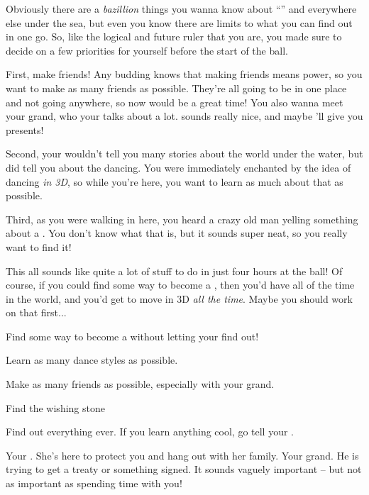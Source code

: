 \documentclass[char]{NeptuneBall}
\begin{document}
Obviously there are a \emph{bazillion} things you wanna know about "`\pAtlantis{}"' and everywhere else under the sea, but even you know there are limits to what you can find out in one go. So, like the logical \cWillow{\prince} and future ruler that you are, you made sure to decide on a few priorities for yourself before the start of the ball.

First, make friends! Any budding \cWillow{\prince} knows that making friends means power, so you want to make as many friends as possible. They're all going to be in one place and not going anywhere, so now would be a great time! You also wanna meet your grand\cKing{\pa}, who your \cAriel{\pa} talks about a lot. \cKing{\They} sounds really nice, and maybe \cKing{\they}'ll give you presents!

Second, your \cAriel{\pa} wouldn't tell you many stories about the world under the water, but \cAriel{\they} did tell you about the dancing. You were immediately enchanted by the idea of dancing \emph{in 3D}, so while you're here, you want to learn as much about that as possible.

Third, as you were walking in here, you heard a crazy old man yelling something about a \iWishingStone{\MYname}. You don't know what that is, but it sounds super neat, so you really want to find it!

This all sounds like quite a lot of stuff to do in just four hours at the ball! Of course, if you could find some way to become a \cWillow{\mer}, then you'd have all of the time in the world, and you'd get to move in 3D \emph{all the time}. Maybe you should work on that first...

\begin{itemz}[Goals]
  \item Find some way to become a \cWillow{\mer} without letting your \cAriel{\parent} find out!
  \item Learn as many dance styles as possible.
  \item Make as many friends as possible, especially with your grand\cKing{\pa}.
	\item Find the wishing stone
  \item Find out everything ever. If you learn anything cool, go tell your \cAriel{\parent}.
\end{itemz}

\begin{contacts}
  \contact{\cAriel{}} Your \cAriel{\parent}. She's here to protect you and hang out with her family.
	\contact{\cKing{}} Your grand\cKing{\parent}. He is trying to get a treaty or something signed. It sounds vaguely important -- but not as important as spending time with you!
\end{contacts}
\end{document}
